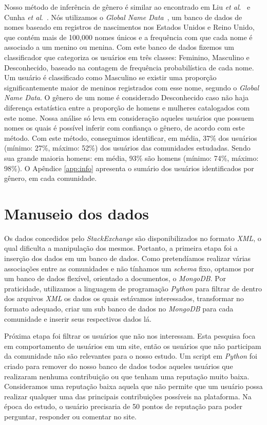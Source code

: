 Nosso método de inferência de gênero é similar ao encontrado em Liu \textit{et al}.~\cite{liu2013s} e Cunha \textit{et al}.~\cite{cunha2014he}. Nós utilizamos o \emph{Global Name Data}~\cite{Hyland:2013:Online}, um banco de dados de nomes baseado em registros de nascimentos nos Estados Unidos e Reino Unido, que contém mais de 100,000 nomes únicos e a frequência com que cada nome é associado a um menino ou menina. Com este banco de dados fizemos um classificador que categoriza os usuários em três classes: Feminino, Masculino e Desconhecido, baseado na contagem de frequência probabilística de cada nome. Um usuário é classificado como Masculino se existir uma proporção significantemente maior de meninos registrados com esse nome, segundo o \emph{Global Name Data}. O gênero de um nome é considerado Desconhecido caso não haja diferença estatística entre a proporção de homens e mulheres catalogados com este nome. Nossa análise só leva em consideração aqueles usuários que possuem nomes os quais é possível inferir com confiança o gênero, de acordo com este método. Com este método, conseguimos identificar, em média, 37\% dos usuários (mínimo: 27\%, máximo: 52\%) dos usuários das comunidades estudadas. Sendo sua grande maioria homens: em média, 93\% são homens (mínimo: 74\%, máximo: 98\%). O Apêndice \ref{app:info} apresenta o sumário dos usuários identificados por gênero, em cada comunidade.

\section{Manuseio dos dados}

Os dados concedidos pelo \emph{StackExchange} são disponibilizados no formato \emph{XML}, o qual dificulta a manipulação dos mesmos. Portanto, a primeira etapa foi a inserção dos dados em um banco de dados. Como pretendíamos realizar várias associações entre as comunidades e não tínhamos um \emph{schema} fixo, optamos por um banco de dados flexível, orientado a documentos, o \emph{MongoDB}. Por praticidade, utilizamos a linguagem de programação \emph{Python} para filtrar de dentro dos arquivos \emph{XML} os dados os quais estávamos interessados, transformar no formato adequado, criar um sub banco de dados no \emph{MongoDB} para cada comunidade e inserir seus respectivos dados lá.

Próxima etapa foi filtrar os usuários que não nos interessam. Esta pesquisa foca em comportamento de usuários em um site, então os usuários que não participam da comunidade não são relevantes para o nosso estudo. Um script em \emph{Python} foi criado para remover do nosso banco de dados todos aqueles usuários que realizaram nenhuma contribuição ou que tenham uma reputação muito baixa. Consideramos uma reputação baixa aquela que não permite que um usuário possa realizar qualquer uma das principais contribuições possíveis na plataforma. Na época do estudo, o usuário precisaria de 50 pontos de reputação para poder perguntar, responder ou comentar no site.


